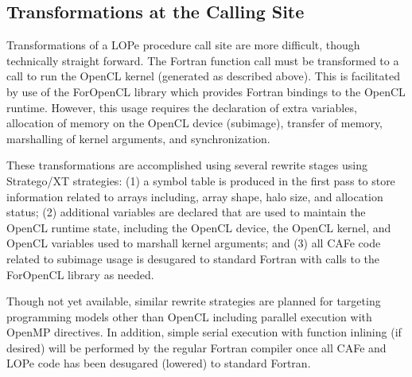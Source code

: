 \subsection{Transformations at the Calling Site}

Transformations of a LOPe procedure call site are more difficult, though technically straight
forward.  The Fortran function call must be transformed to a call to run the OpenCL kernel
(generated as described above).  This is facilitated by use of the ForOpenCL library which
provides Fortran bindings to the OpenCL runtime\cite{Sottile:2013:FTE:2441516.2441520}.  However,
this usage requires the declaration of extra variables, allocation of memory on the OpenCL device
(subimage), transfer of memory, marshalling of kernel arguments, and synchronization.

These transformations are accomplished using several rewrite stages using Stratego/XT strategies:
(1) a symbol table is produced in the first pass to store information related to arrays including,
array shape, halo size, and allocation status;
(2) additional variables are declared that are used to maintain the OpenCL runtime state, including
the OpenCL device, the OpenCL kernel, and OpenCL variables used to marshall kernel arguments; and
(3) all CAFe code related to subimage usage is desugared to standard Fortran with calls to the
ForOpenCL library as needed.

Though not yet available, similar rewrite strategies are planned for targeting programming models
other than OpenCL including parallel execution with OpenMP directives.  In addition, simple serial
execution with function inlining (if desired) will be performed by the regular Fortran compiler once
all CAFe and LOPe code has been desugared (lowered) to standard Fortran.



